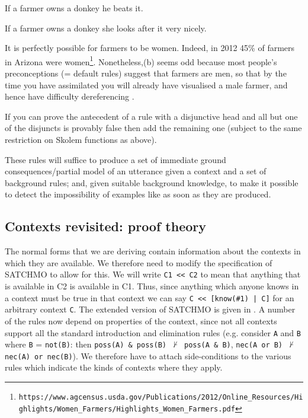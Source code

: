 \documentclass[11pt,a4paper]{article}
\begin{document}
\begin{itemize}
\begin{examples}
\item\label{S:FARMER}
\begin{examples}
\item
If a farmer owns a donkey he beats it.
\item
If a farmer owns a donkey she looks after it very nicely.
\end{examples}
\end{examples}

\noindent
It is perfectly possible for farmers to be women. Indeed, in 2012 45\%
of farmers in Arizona were
women\footnote{\texttt{https://www.agcensus.usda.gov/Publications/2012/Online\_Resources/Highlights/Women\_Farmers/Highlights\_Women\_Farmers.pdf}}. Nonetheless,(b)
seems odd because most people's preconceptions (=
default rules) suggest that farmers are men, so that by the time you
have assimilated  you will already have
visualised a male farmer, and hence have difficulty dereferencing
.

\item
If you can prove the antecedent of a rule with a disjunctive head and
all but one of the disjuncts is provably false then add the remaining
one (subject to the same restriction on Skolem functions as above).
\end{itemize}

These rules will suffice to produce a set of immediate ground
consequences/partial model of an utterance given a context and a set
of background rules; and, given suitable background knowledge, to make
it possible to detect the impossibility of examples like
 as soon as they are produced.

\subsection{Contexts revisited: proof theory}\label{SEC:CONTEXTS}

The normal forms that we are deriving contain information about the
contexts in which they are available. We therefore need to
modify the specification of SATCHMO to allow for this. We will write
\texttt{C1 << C2} to mean that anything that is available in C2 is
available in C1. Thus, since anything which anyone knows in a context
must be true in that context we can say \texttt{C << [know(\#1) | C]}
for an arbitrary context \texttt{C}.  The extended version of SATCHMO
is given in . A number of the rules now depend
on properties of the context, since not all contexts support all the
standard introduction and elimination rules (e.g. consider \texttt{A}
and \texttt{B} where \texttt{B} = \texttt{not(B)}: then \texttt{poss(A) \&
  poss(B) $\not\vdash$ poss(A \& B)}, \texttt{nec(A or B) $\not\vdash$
  nec(A) or nec(B)}). We therefore have to attach side-conditions to
the various rules which indicate the kinds of contexts where they apply.
\end{document}
